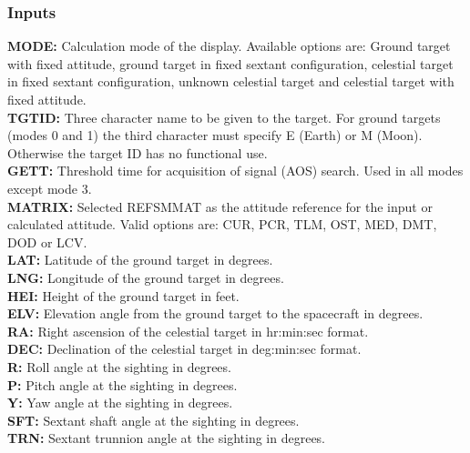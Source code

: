 \documentclass[11pt]{article} %
\begin{document}
\subsubsection{Inputs}
\textbf{MODE:} Calculation mode of the display. Available options are: Ground target with fixed attitude, ground target in fixed sextant configuration, celestial target in fixed sextant configuration, unknown celestial target and celestial target with fixed attitude.\\
\textbf{TGTID:} Three character name to be given to the target. For ground targets (modes 0 and 1) the third character must specify E (Earth) or M (Moon). Otherwise the target ID has no functional use.\\
\textbf{GETT:} Threshold time for acquisition of signal (AOS) search. Used in all modes except mode 3.\\
\textbf{MATRIX:} Selected REFSMMAT as the attitude reference for the input or calculated attitude. Valid options are: CUR, PCR, TLM, OST, MED, DMT, DOD or LCV.\\
\textbf{LAT:} Latitude of the ground target in degrees.\\
\textbf{LNG:} Longitude of the ground target in degrees.\\
\textbf{HEI:} Height of the ground target in feet.\\
\textbf{ELV:} Elevation angle from the ground target to the spacecraft in degrees.\\
\textbf{RA:} Right ascension of the celestial target in hr:min:sec format.\\
\textbf{DEC:} Declination of the celestial target in deg:min:sec format.\\
\textbf{R:} Roll angle at the sighting in degrees.\\
\textbf{P:} Pitch angle at the sighting in degrees.\\
\textbf{Y:} Yaw angle at the sighting in degrees.\\
\textbf{SFT:} Sextant shaft angle at the sighting in degrees.\\
\textbf{TRN:} Sextant trunnion angle at the sighting in degrees.\\
\newpage
\end{document}
